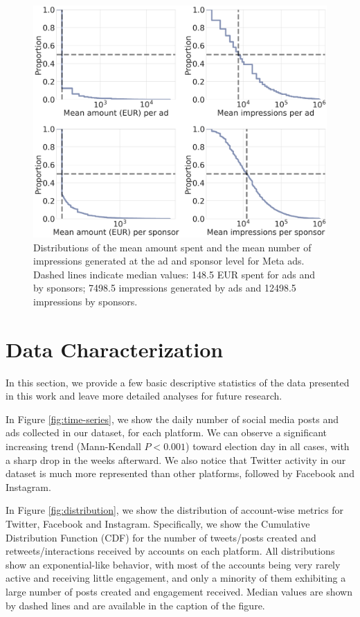 \documentclass[letterpaper]{article} %
\begin{document}
\begin{figure}[!t]
    \centering
    \includegraphics[width=\linewidth]{distribution_ads.png}
    \caption{Distributions of the mean amount spent and the mean number of impressions generated at the ad and sponsor level for Meta ads. Dashed lines indicate median values: 148.5 EUR spent for ads and by sponsors; 7498.5 impressions generated by ads and 12498.5 impressions by sponsors.}
    \label{fig:distribution-ads}
\end{figure}

\section{Data Characterization}
In this section, we provide a few basic descriptive statistics of the data presented in this work and leave more detailed analyses for future research.

In Figure \ref{fig:time-series}, we show the daily number of social media posts and ads collected in our dataset, for each platform. We can observe a significant increasing trend (Mann-Kendall $P < 0.001$) toward election day in all cases, with a sharp drop in the weeks afterward. We also notice that Twitter activity in our dataset is much more represented than other platforms, followed by Facebook and Instagram.

In Figure \ref{fig:distribution}, we show the distribution of account-wise metrics for Twitter, Facebook and Instagram. Specifically, we show the Cumulative Distribution Function (CDF) for the number of tweets/posts created and retweets/interactions received by accounts on each platform. All distributions show an exponential-like behavior, with most of the accounts being very rarely active and receiving little engagement, and only a minority of them exhibiting a large number of posts created and engagement received. Median values are shown by dashed lines and are available in the caption of the figure.
\end{document}

